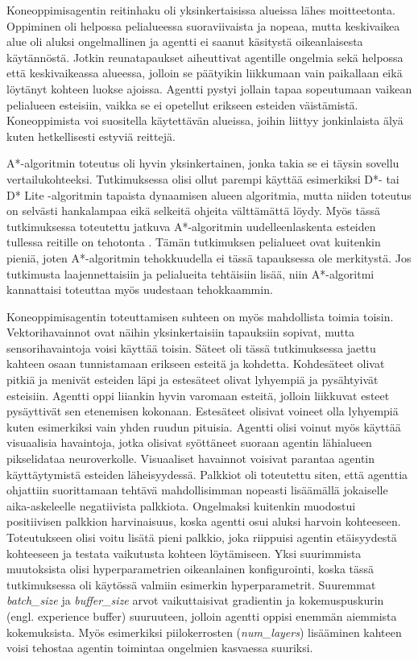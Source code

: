 \documentclass[utf8]{gradu3}
\begin{document}
Koneoppimisagentin reitinhaku oli yksinkertaisissa alueissa lähes moitteetonta. Oppiminen oli helpossa pelialueessa suoraviivaista ja nopeaa, mutta keskivaikea alue oli aluksi ongelmallinen ja agentti ei saanut käsitystä oikeanlaisesta käytännöstä. Jotkin reunatapaukset aiheuttivat agentille ongelmia sekä helpossa että keskivaikeassa alueessa, jolloin se päätyikin liikkumaan vain paikallaan eikä löytänyt kohteen luokse ajoissa. Agentti pystyi jollain tapaa sopeutumaan vaikean pelialueen esteisiin, vaikka se ei opetellut erikseen esteiden väistämistä. Koneoppimista voi suositella käytettävän alueissa, joihin liittyy jonkinlaista älyä kuten hetkellisesti estyviä reittejä.

A*-algoritmin toteutus oli hyvin yksinkertainen, jonka takia se ei täysin sovellu vertailukohteeksi. Tutkimuksessa olisi ollut parempi käyttää esimerkiksi D*- tai D* Lite -algoritmin tapaista dynaamisen alueen algoritmia, mutta niiden toteutus on selvästi hankalampaa eikä selkeitä ohjeita välttämättä löydy. Myös tässä tutkimuksessa toteutettu jatkuva A*-algoritmin uudelleenlaskenta esteiden tullessa reitille on tehotonta \parencite{stentz1995focussed}. Tämän tutkimuksen pelialueet ovat kuitenkin pieniä, joten A*-algoritmin tehokkuudella ei tässä tapauksessa ole merkitystä. Jos tutkimusta laajennettaisiin ja pelialueita tehtäisiin lisää, niin A*-algoritmi kannattaisi toteuttaa myös uudestaan tehokkaammin.

Koneoppimisagentin toteuttamisen suhteen on myös mahdollista toimia toisin. Vektorihavainnot ovat näihin yksinkertaisiin tapauksiin sopivat, mutta sensorihavaintoja voisi käyttää toisin. Säteet oli tässä tutkimuksessa jaettu kahteen osaan tunnistamaan erikseen esteitä ja kohdetta. Kohdesäteet olivat pitkiä ja menivät esteiden läpi ja estesäteet olivat lyhyempiä ja pysähtyivät esteisiin. Agentti oppi liiankin hyvin varomaan esteitä, jolloin liikkuvat esteet pysäyttivät sen etenemisen kokonaan. Estesäteet olisivat voineet olla lyhyempiä kuten esimerkiksi vain yhden ruudun pituisia. Agentti olisi voinut myös käyttää visuaalisia havaintoja, jotka olisivat syöttäneet suoraan agentin lähialueen pikselidataa neuroverkolle. Visuaaliset havainnot voisivat parantaa agentin käyttäytymistä esteiden läheisyydessä. Palkkiot oli toteutettu siten, että agenttia ohjattiin suorittamaan tehtävä mahdollisimman nopeasti lisäämällä jokaiselle aika-askeleelle negatiivista palkkiota. Ongelmaksi kuitenkin muodostui positiivisen palkkion harvinaisuus, koska agentti osui aluksi harvoin kohteeseen. Toteutukseen olisi voitu lisätä pieni palkkio, joka riippuisi agentin etäisyydestä kohteeseen ja testata vaikutusta kohteen löytämiseen. Yksi suurimmista muutoksista olisi hyperparametrien oikeanlainen konfigurointi, koska tässä tutkimuksessa oli käytössä valmiin esimerkin hyperparametrit. Suuremmat \textit{batch\_size} ja \textit{buffer\_size} arvot vaikuttaisivat gradientin ja kokemuspuskurin (engl. experience buffer) suuruuteen, jolloin agentti oppisi enemmän aiemmista kokemuksista. Myös esimerkiksi piilokerrosten (\textit{num\_layers}) lisääminen kahteen voisi tehostaa agentin toimintaa ongelmien kasvaessa suuriksi.
\end{document}
